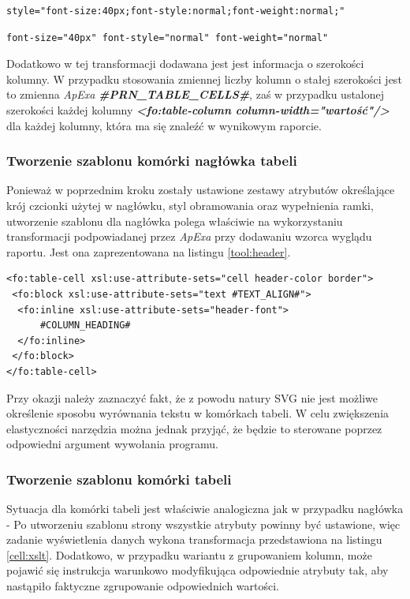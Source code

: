 \documentclass[11pt,a4paper]{article}
\begin{document}
\lstset{}
\begin{lstlisting}[frame=single,caption=Przykład stylu obiektu utworzonego w programie \emph{InkScape}, label=con:css]
style="font-size:40px;font-style:normal;font-weight:normal;"
\end{lstlisting}

\lstset{}
\begin{lstlisting}[frame=single,caption=Przykład wymaganej postaci stylu obiektu, label=con:apex]
font-size="40px" font-style="normal" font-weight="normal"
\end{lstlisting}

Dodatkowo w tej transformacji dodawana jest jest informacja o szerokości kolumny. W przypadku stosowania zmiennej liczby kolumn o stałej szerokości jest to zmienna \emph{ApExa} \textbf{\emph{\#PRN\_TABLE\_CELLS\#}}, zaś w przypadku ustalonej szerokości każdej kolumny \emph{\textbf{\textless fo:table-column column-width="wartość"/\textgreater}} dla każdej kolumny, która ma się znaleźć w wynikowym raporcie.


\subsubsection{Tworzenie szablonu komórki nagłówka tabeli} \label{table:header}
Ponieważ w poprzednim kroku zostały ustawione zestawy atrybutów określające krój czcionki użytej w nagłówku, styl obramowania oraz wypełnienia ramki, utworzenie szablonu dla nagłówka polega właściwie na wykorzystaniu transformacji podpowiadanej przez \emph{ApExa} przy dodawaniu wzorca wyglądu raportu. Jest ona zaprezentowana na listingu \ref{tool:header}.

\lstset{language=XSLT}
\begin{lstlisting}[frame=single,caption=Transformacja dla nagłówka tabeli, label=tool:header]
<fo:table-cell xsl:use-attribute-sets="cell header-color border">
 <fo:block xsl:use-attribute-sets="text #TEXT_ALIGN#">
  <fo:inline xsl:use-attribute-sets="header-font">
      #COLUMN_HEADING#
  </fo:inline>
 </fo:block>
</fo:table-cell>
\end{lstlisting}

Przy okazji należy zaznaczyć fakt, że z powodu natury SVG nie jest możliwe określenie sposobu wyrównania tekstu w komórkach tabeli. W celu zwiększenia elastyczności narzędzia można jednak przyjąć, że będzie to sterowane poprzez odpowiedni argument wywołania programu.

\subsubsection{Tworzenie szablonu komórki tabeli}
Sytuacja dla komórki tabeli jest właściwie analogiczna jak w przypadku nagłówka - Po utworzeniu szablonu strony wszystkie atrybuty powinny być ustawione, więc zadanie wyświetlenia danych wykona transformacja przedstawiona na listingu \ref{cell:xslt}. Dodatkowo, w przypadku wariantu z grupowaniem kolumn, może pojawić się instrukcja warunkowo modyfikująca odpowiednie atrybuty tak, aby nastąpiło faktyczne zgrupowanie odpowiednich wartości.
\end{document}
